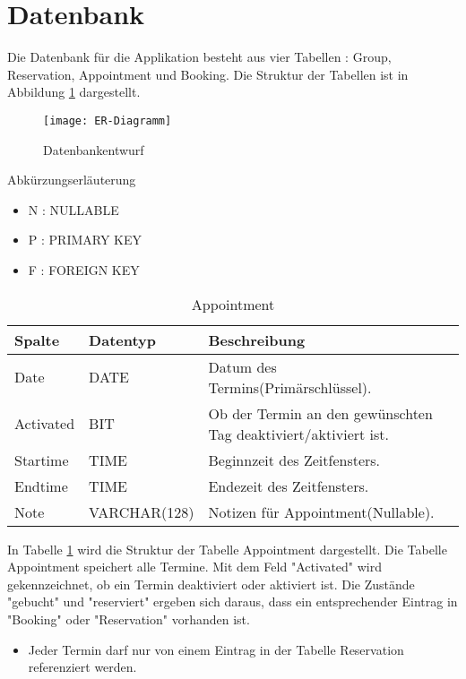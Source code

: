 \documentclass[10pt,a4paper]{article}
\begin{document}
\section{Datenbank}
Die Datenbank für die Applikation besteht aus vier Tabellen : Group, Reservation, Appointment und Booking.
Die Struktur der Tabellen ist in Abbildung \ref{fig:ER-Diagramm} dargestellt.

\begin{figure}[ht]		
	\centering
	\texttt{[image: ER-Diagramm]}
	\caption{Datenbankentwurf}
	\label{fig:ER-Diagramm}	
	\end{figure}

Abkürzungserläuterung
\begin{itemize}
\item N : NULLABLE
\item P : PRIMARY KEY
\item F : FOREIGN KEY
\end{itemize}

\begin{table}[h]
\centering
\caption{Appointment}
	\label{tab:Appointment}   
    \begin{tabular}{| l | l | l | l |}
    \hline
    \rowcolor{lightgray} Spalte & Datentyp & Beschreibung  \\ \hline
    Date  & DATE & Datum des Termins(Primärschlüssel).\\ \hline
    Activated & BIT & Ob der Termin an den gewünschten Tag deaktiviert/aktiviert ist.\\ \hline
    Startime & TIME & Beginnzeit des Zeitfensters. \\ \hline
    Endtime & TIME & Endezeit des Zeitfensters.  \\ \hline
    Note & VARCHAR(128) & Notizen für Appointment(Nullable). \\ \hline
    \end{tabular}
\end{table}

In Tabelle \ref{tab:Appointment} wird die Struktur der Tabelle Appointment dargestellt. Die Tabelle Appointment speichert alle Termine. Mit dem Feld "Activated" wird gekennzeichnet, ob ein Termin deaktiviert oder aktiviert ist. Die Zustände "gebucht" und "reserviert" ergeben sich daraus, dass ein entsprechender Eintrag in "Booking" oder "Reservation" vorhanden ist.
\begin{itemize}
\item Jeder Termin darf nur von einem Eintrag in der Tabelle Reservation referenziert werden. 
\end{itemize}
\end{document}
